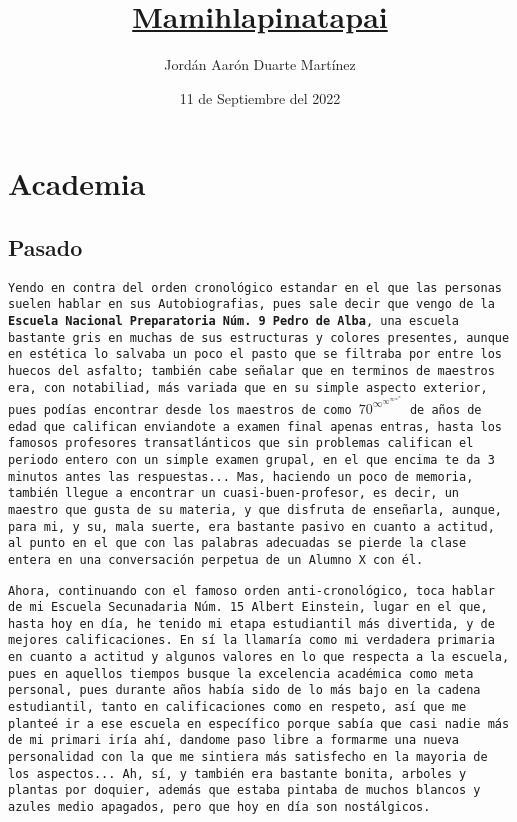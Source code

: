 \documentclass[12pt,letterpaper]{article}
\title{\underline{\textbf{Mamihlapinatapai}}}
\author{Jordán Aarón Duarte Martínez }
\date{11 de Septiembre del 2022}
\begin{document}
\maketitle

\section{\Huge{\textbf{Academia}}}
    \subsection{\huge{Pasado}}
{\texttt{Yendo en contra del orden cronológico estandar en el que las personas suelen hablar en sus Autobiografias, pues sale decir que vengo de la {\large{\textbf{Escuela Nacional Preparatoria Núm. 9 Pedro de Alba}}}, una escuela bastante gris en muchas de sus estructuras y colores presentes, aunque en estética lo salvaba un poco el pasto que se filtraba por entre los huecos del asfalto; también cabe señalar que en terminos de maestros era, con notabiliad, más variada que en su simple aspecto exterior, pues podías encontrar desde los maestros de como $70^{\infty^{\infty^{\infty^{\infty^{\infty}}}}}$ de años de edad que califican enviandote a examen final apenas entras, hasta los famosos profesores transatlánticos que sin problemas califican el periodo entero con un simple examen grupal, en el que encima te da 3 minutos antes las respuestas... Mas, haciendo un poco de memoria, también llegue a encontrar un cuasi-buen-profesor, es decir, un maestro que gusta de su materia, y que disfruta de enseñarla, aunque, para mi, y su, mala suerte, era bastante pasivo en cuanto a actitud, al punto en el que con las palabras adecuadas se pierde la clase entera en una conversación perpetua de un Alumno X con él.\\}}

{\texttt{Ahora, continuando con el famoso orden anti-cronológico, toca hablar de mi Escuela Secunadaria Núm. 15 Albert Einstein, lugar en el que, hasta hoy en día, he tenido mi etapa estudiantil más divertida, y de mejores calificaciones. En sí la llamaría como mi verdadera primaria en cuanto a actitud y algunos valores en lo que respecta a la escuela, pues en aquellos tiempos busque la excelencia académica como meta personal, pues durante años había sido de lo más bajo en la cadena estudiantil, tanto en calificaciones como en respeto, así que me planteé ir a ese escuela en específico porque sabía que casi nadie más de mi primari iría ahí, dandome paso libre a formarme una nueva personalidad con la que me sintiera más satisfecho en la mayoria de los aspectos... Ah, sí, y también era bastante bonita, arboles y plantas por doquier, además que estaba pintaba de muchos blancos y azules medio apagados, pero que hoy en día son nostálgicos.\\}}
\end{document}
